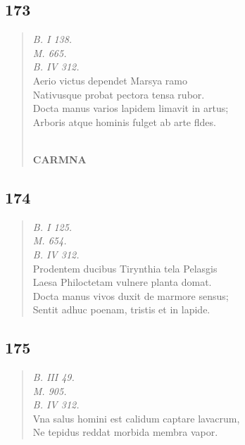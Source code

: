 \documentclass[11pt, a4paper]{report}
\begin{document}
            \subsection*{173}
      \begin{verse}
      \textit{B. I 138.} \\ \textit{M. 665.} \\ \textit{B. IV 312.} \\ Aerio victus dependet Marsya ramo \\ Nativusque probat pectora tensa rubor. \\ Docta manus varios lapidem limavit in artus; \\ Arboris atque hominis fulget ab arte fldes. \\ 
        ﻿\pagebreak 
    \begin{center} \textbf{CARMNA} \end{center} \marginpar{[152]} 
      \end{verse}
  
            \subsection*{174}
      \begin{verse}
      \textit{B. I 125.} \\ \textit{M. 654.} \\ \textit{B. IV 312.} \\ Prodentem ducibus Tirynthia tela Pelasgis \\ Laesa Philoctetam vulnere planta domat. \\ Docta manus vivos duxit de marmore sensus; \\ Sentit adhuc poenam, tristis et in lapide. \\ 
      \end{verse}
  
            \subsection*{175}
      \begin{verse}
      \textit{B. III 49.} \\ \textit{M. 905.} \\ \textit{B. IV 312.} \\ Vna salus homini est calidum captare lavacrum, \\ Ne tepidus reddat morbida membra vapor. \\ 
      \end{verse}
  
\end{document}
